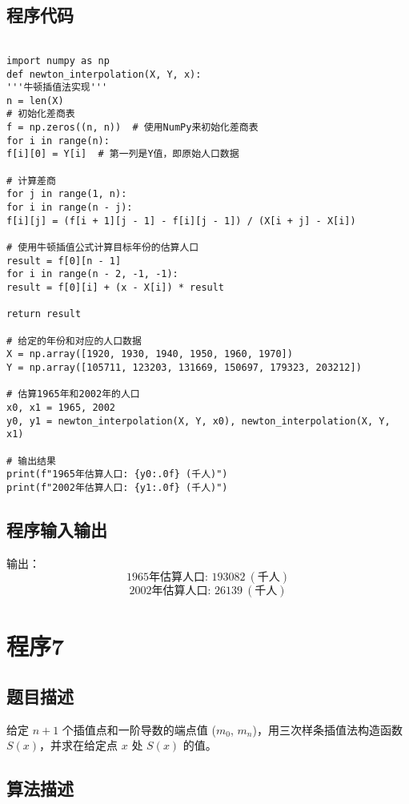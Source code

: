 \documentclass[b5paper;twoside]{article}
\begin{document}
\subsection{程序代码}

\begin{lstlisting}

import numpy as np
def newton_interpolation(X, Y, x):
'''牛顿插值法实现'''
n = len(X) 
# 初始化差商表
f = np.zeros((n, n))  # 使用NumPy来初始化差商表
for i in range(n):
f[i][0] = Y[i]  # 第一列是Y值，即原始人口数据

# 计算差商
for j in range(1, n):
for i in range(n - j):
f[i][j] = (f[i + 1][j - 1] - f[i][j - 1]) / (X[i + j] - X[i])

# 使用牛顿插值公式计算目标年份的估算人口
result = f[0][n - 1]
for i in range(n - 2, -1, -1):
result = f[0][i] + (x - X[i]) * result

return result

# 给定的年份和对应的人口数据
X = np.array([1920, 1930, 1940, 1950, 1960, 1970])
Y = np.array([105711, 123203, 131669, 150697, 179323, 203212])

# 估算1965年和2002年的人口
x0, x1 = 1965, 2002
y0, y1 = newton_interpolation(X, Y, x0), newton_interpolation(X, Y, x1)

# 输出结果
print(f"1965年估算人口: {y0:.0f} (千人)")
print(f"2002年估算人口: {y1:.0f} (千人)")

\end{lstlisting}

\subsection{程序输入输出}

输出：
\[
\text{1965年估算人口: } 193082 \ (\text{千人})
\]
\[
\text{2002年估算人口: } 26139 \ (\text{千人})
\]

\section{程序7}

\subsection{题目描述}

给定 $n+1$ 个插值点和一阶导数的端点值 ($m_0$, $m_n$)，用三次样条插值法构造函数 
$S(x)$，并求在给定点 $x$ 处 $S(x)$ 的值。

\subsection{算法描述}
\end{document}
